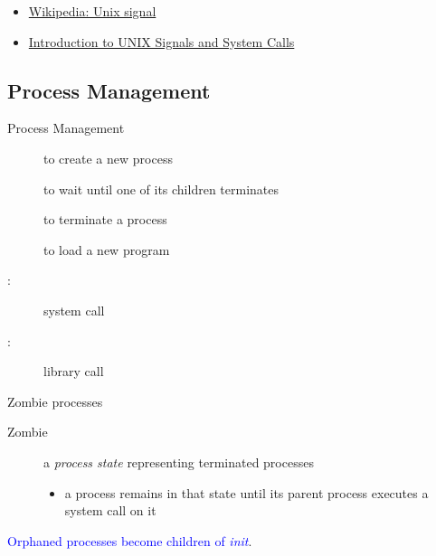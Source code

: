 \begin{itemize}
\item \href{http://en.wikipedia.org/wiki/Unix_signal}{Wikipedia: Unix signal}
\item
  \href{http://ph7spot.com/musings/introduction-to-unix-signals-and-system-calls}{Introduction
  to UNIX Signals and System Calls}
\end{itemize}

\subsection{Process Management}
\label{sec:process-management}

\begin{frame}
  \begin{exampleblock}{Process Management}
    \begin{description}
    \item[] to create a new process
    \item[] to wait until one of its children terminates
    \item[] to terminate a process
    \item[] to load a new program
    \end{description}
  \end{exampleblock}
\end{frame}

\begin{description}
\item[:] system call
\item[:] library call
\end{description}

\begin{frame}%
  \begin{exampleblock}{Zombie processes}
    \begin{description}
    \item[Zombie] a \emph{process state} representing terminated processes
      \begin{itemize}
      \item a process remains in that state until its parent process executes a
         system call on it
      \end{itemize}
    \end{description}
  \end{exampleblock}
  \textcolor{blue}{Orphaned processes become children of \emph{init}}.
\end{frame}

